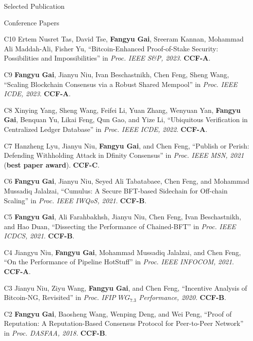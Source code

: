 \documentclass{resume} %
\begin{document}
\begin{rSection}{Selected Publication}

\begin{rSubsection}{Conference Papers}{}{}{}
\item [C10] Ertem Nusret Tas, David Tse, \textbf{Fangyu Gai}, Sreeram Kannan, Mohammad Ali Maddah-Ali, Fisher Yu, ``Bitcoin-Enhanced Proof-of-Stake Security: Possibilities and Impossibilities'' in \textit{Proc. IEEE S\&P, 2023}.
\textbf{CCF-A}.

\item [C9] \textbf{Fangyu Gai}, Jianyu Niu, Ivan Beschastnikh, Chen Feng, Sheng Wang, ``Scaling Blockchain Consensus via a Robust Shared Mempool'' in \textit{Proc. IEEE ICDE, 2023}.
\textbf{CCF-A}.

\item [C8] Xinying Yang, Sheng Wang, Feifei Li, Yuan Zhang, Wenyuan Yan, \textbf{Fangyu Gai}, Benquan Yu, Likai Feng, Qun Gao, and Yize Li, ``Ubiquitous Verification in Centralized Ledger Database'' in \textit{Proc. IEEE ICDE, 2022}.
\textbf{CCF-A}.

\item [C7] Hanzheng Lyu, Jianyu Niu, \textbf{Fangyu Gai}, and Chen Feng, ``Publish or Perish: Defending Withholding Attack in Dfinity Consensus'' in \textit{Proc. IEEE MSN, 2021} (\textbf{best paper award}).
\textbf{CCF-C}.

\item [C6] \textbf{Fangyu Gai}, Jianyu Niu, Seyed Ali Tabatabaee, Chen Feng, and Mohammad Mussadiq Jalalzai, ``Cumulus: A Secure BFT-based Sidechain for Off-chain Scaling'' in \textit{Proc. IEEE IWQoS, 2021}.
\textbf{CCF-B}.

\item [C5] \textbf{Fangyu Gai}, Ali Farahbakhsh, Jianyu Niu, Chen Feng, Ivan Beschastnikh, and Hao Duan, ``Dissecting the Performance of Chained-BFT'' in \textit{Proc. IEEE ICDCS, 2021}.
\textbf{CCF-B}.

\item [C4] Jiangyu Niu, \textbf{Fangyu Gai}, Mohammad Mussadiq Jalalzai, and Chen Feng, ``On the Performance of Pipeline HotStuff'' in \textit{Proc. IEEE INFOCOM, 2021}.
\textbf{CCF-A}.

\item [C3] Jianyu Niu, Ziyu Wang, \textbf{Fangyu Gai}, and Chen Feng, ``Incentive Analysis of Bitcoin-NG, Revisited'' in \textit{Proc. IFIP $WG_{7.3}$ Performance, 2020.}
\textbf{CCF-B}.

\item [C2] \textbf{Fangyu Gai}, Baosheng Wang, Wenping Deng, and Wei Peng, ``Proof of Reputation: A Reputation-Based Consensus Protocol for Peer-to-Peer Network'' in \textit{Proc. DASFAA, 2018.}
\textbf{CCF-B}.


\end{rSubsection}
\end{rSection}
\end{document}
